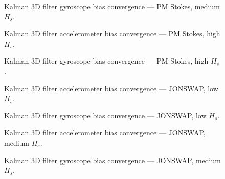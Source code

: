 \documentclass[11pt,letterpaper]{article}
\begin{document}
    \begin{figure}[H]\centering
    \resizebox{\textwidth}{!}{}
    \caption{Kalman 3D filter gyroscope bias convergence — PM Stokes, medium $H_s$.}
    \label{fig:w3d_ou3_pmstokes_medium_gyro_bias}
    \end{figure}

    \begin{figure}[H]\centering
    \resizebox{\textwidth}{!}{}
    \caption{Kalman 3D filter accelerometer bias convergence — PM Stokes, high $H_s$.}
    \label{fig:w3d_ou3_pmstokes_high_acc_bias}
    \end{figure}

    \begin{figure}[H]\centering
    \resizebox{\textwidth}{!}{}
    \caption{Kalman 3D filter gyroscope bias convergence — PM Stokes, high $H_s$.}
    \label{fig:w3d_ou3_pmstokes_high_gyro_bias}
    \end{figure}

    \begin{figure}[H]\centering
    \resizebox{\textwidth}{!}{}
    \caption{Kalman 3D filter accelerometer bias convergence — JONSWAP, low $H_s$.}
    \label{fig:w3d_ou3_jonswap_low_acc_bias}
    \end{figure}

    \begin{figure}[H]\centering
    \resizebox{\textwidth}{!}{}
    \caption{Kalman 3D filter gyroscope bias convergence — JONSWAP, low $H_s$.}
    \label{fig:w3d_ou3_jonswap_low_gyro_bias}
    \end{figure}

    \begin{figure}[H]\centering
    \resizebox{\textwidth}{!}{}
    \caption{Kalman 3D filter accelerometer bias convergence — JONSWAP, medium $H_s$.}
    \label{fig:w3d_ou3_jonswap_medium_acc_bias}
    \end{figure}

    \begin{figure}[H]\centering
    \resizebox{\textwidth}{!}{}
    \caption{Kalman 3D filter gyroscope bias convergence — JONSWAP, medium $H_s$.}
    \label{fig:w3d_ou3_jonswap_medium_gyro_bias}
    \end{figure}
\end{document}
